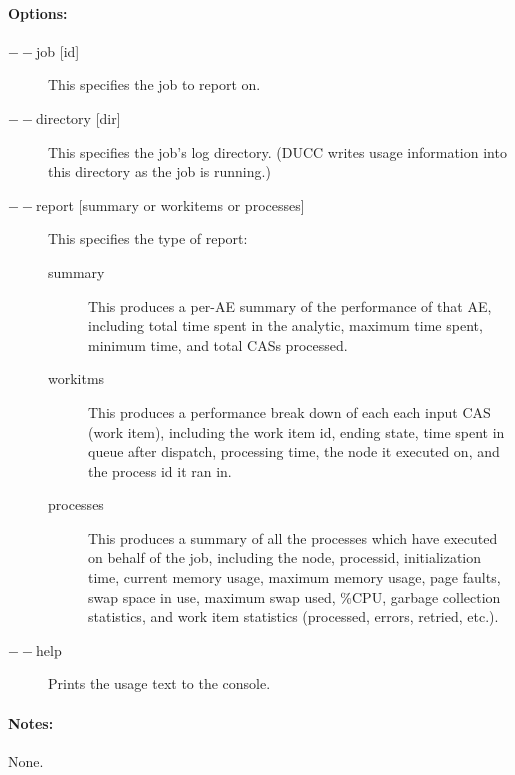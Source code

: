     \paragraph{Options:}
    \begin{description}
        \item[$--$job {[id]}] This specifies the job to report on.
        \item[$--$directory {[dir]}] This specifies the job's log directory. (DUCC writes usage information into this
          directory as the job is running.)
        \item[$--$report {[summary or workitems or processes]}]
          This specifies the type of report:
          \begin{description}
              \item[summary] This produces a per-AE summary of the performance of that AE, including
                total time spent in the analytic, maximum time spent, minimum time, and total CASs
                processed.
              \item[workitms] This produces a performance break down of each each input CAS (work
                item), including the work item id, ending state, time spent in queue after dispatch,
                processing time, the node it executed on, and the process id it ran in.
              \item[processes] This produces a summary of all the processes which have executed on
                behalf of the job, including the node, processid, initialization time, current memory usage,
                maximum memory usage, page faults, swap space in use, maximum swap used, \%CPU,
                garbage collection statistics, and work item statistics (processed, errors, retried, etc.).
          \end{description}
        \item[$--$help] Prints the usage text to the console. 
     \end{description}
        
    \paragraph{Notes:}
    None.

